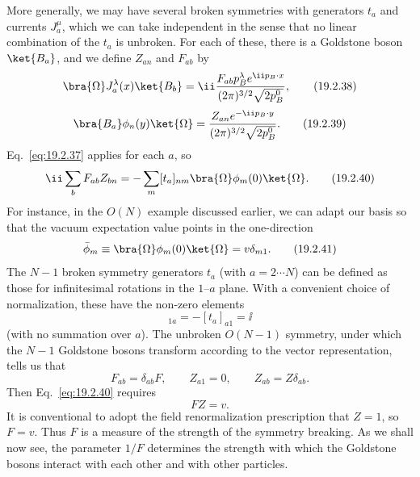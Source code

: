 More generally, we may have several broken symmetries with generators $t_a$
and currents $J^\mu_a$, which we can take independent in the sense that no
linear combination of the $t_a$ is unbroken. For each of these, there is a
Goldstone boson $\ket{B_a}$, and we define $Z_{an}$ and $F_{ab}$ by
\begin{equation}
 \bra{\Omega}J^\lambda_a(x)\ket{B_b}
 =\ii\frac{F_{ab}p_B^\lambda e^{\ii p_B\cdot x}}
 {(2\pi)^{3/2}\sqrt{2p_B^0}},
 \tag{19.2.38}\label{eq:19.2.38}
\end{equation}
\begin{equation}
 \bra{B_a}\phi_n(y)\ket{\Omega}
 =\frac{Z_{an}e^{-\ii p_B\cdot y}}
 {(2\pi)^{3/2}\sqrt{2p_B^0}}.
 \tag{19.2.39}\label{eq:19.2.39}
\end{equation}
Eq.~\eqref{eq:19.2.37} applies for each $a$, so
\begin{equation}
 \ii\sum_b F_{ab}Z_{bn}
 =-\sum_m[t_a]_{nm}\bra{\Omega}\phi_m(0)\ket{\Omega}.
 \tag{19.2.40}\label{eq:19.2.40}
\end{equation}
For instance, in the $O(N)$ example discussed earlier, we can adapt our basis
so that the vacuum expectation value points in the one-direction
\begin{equation}
 \bar\phi_m\equiv\bra{\Omega}\phi_m(0)\ket{\Omega}
 =v\delta_{m1}.
 \tag{19.2.41}\label{eq:19.2.41}
\end{equation}
The $N-1$ broken symmetry generators $t_a$ (with $a=2\cdots N$) can be
defined as those for infinitesimal rotations in the $1$--$a$ plane. With a
convenient choice of normalization, these have the non-zero elements
\begin{equation}
 [t_a]_{1a}=-[t_a]_{a1}=\ii
 \tag{19.2.42}\label{eq:19.2.42}
\end{equation}
(with no summation over $a$). The unbroken $O(N-1)$ symmetry, under which the
$N-1$ Goldstone bosons transform according to the vector representation,
tells us that
\begin{equation}
 F_{ab}=\delta_{ab}F,\qquad Z_{a1}=0,\qquad Z_{ab}=Z\delta_{ab}.
 \tag{19.2.43}\label{eq:19.2.43}
\end{equation}
Then Eq.~\eqref{eq:19.2.40} requires
\begin{equation}
 FZ=v.
 \tag{19.2.44}\label{eq:19.2.44}
\end{equation}
It is conventional to adopt the field renormalization prescription that
$Z=1$, so $F=v$. Thus $F$ is a measure of the strength of the symmetry
breaking. As we shall now see, the parameter $1/F$ determines the strength
with which the Goldstone bosons interact with each other and with other
particles.

